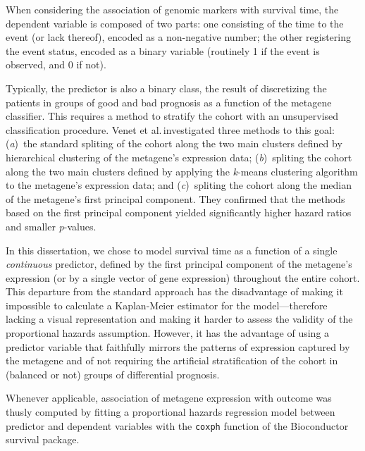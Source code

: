 When considering the association of genomic markers with survival time, the
dependent variable is composed of two parts: one consisting of the time to the
event (or lack thereof), encoded as a non-negative number; the other registering
the event status, encoded as a binary variable (routinely 1 if the event is
observed, and 0 if not).

Typically, the predictor is also a binary class, the result of discretizing the
patients in groups of good and bad prognosis as a function of the metagene
classifier.  This requires a method to stratify the cohort with an unsupervised
classification procedure.  Venet et al.\cite{venet_most_2011}\,investigated
three methods to this goal: (\emph{a})~the standard spliting of the cohort along
the two main clusters defined by hierarchical clustering of the metagene's
expression data;
(\emph{b})~spliting the cohort along the two main clusters defined
by applying the \emph{k}-means clustering algorithm to the metagene's expression
data;
and (\emph{c})~spliting the cohort along the median of the metagene's first
principal component.
They confirmed that the methods based on the first principal
component %
yielded significantly higher hazard ratios and smaller \emph{p}-values.

In this dissertation, we chose to model survival time as a function of a single
\emph{continuous} predictor, defined by the first principal component of the
metagene's expression (or by a single vector of gene expression) throughout the
entire cohort.  This departure from the standard approach has the disadvantage
of making it impossible to calculate a Kaplan-Meier estimator for the
model---therefore lacking a visual representation and making it harder to assess
the validity of the proportional hazards assumption.  However, it has the
advantage of using a predictor variable that faithfully mirrors the patterns of
expression captured by the metagene and of not requiring the artificial
stratification of the cohort in (balanced or not) groups of differential
prognosis.

Whenever applicable, association of metagene expression with outcome was thusly
computed by fitting a proportional hazards regression model between predictor
and dependent variables with the \texttt{coxph} function of the
\textsf{Bioconductor} \textsf{survival} package.


